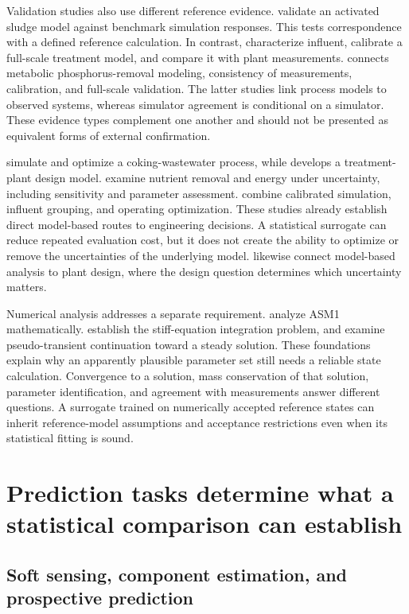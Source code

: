 Validation studies also use different reference evidence. \citet{Calise2020} validate an activated sludge model against benchmark simulation responses. This tests correspondence with a defined reference calculation. In contrast, \citet{SadriMoghaddam2021} characterize influent, calibrate a full-scale treatment model, and compare it with plant measurements. \citet{Meijer2004} connects metabolic phosphorus-removal modeling, consistency of measurements, calibration, and full-scale validation. The latter studies link process models to observed systems, whereas simulator agreement is conditional on a simulator. These evidence types complement one another and should not be presented as equivalent forms of external confirmation.

\citet{Wu2016} simulate and optimize a coking-wastewater process, while \citet{Jasim2020} develops a treatment-plant design model. \citet{Szelag2022} examine nutrient removal and energy under uncertainty, including sensitivity and parameter assessment. \citet{Nazif2023} combine calibrated simulation, influent grouping, and operating optimization. These studies already establish direct model-based routes to engineering decisions. A statistical surrogate can reduce repeated evaluation cost, but it does not create the ability to optimize or remove the uncertainties of the underlying model. \citet{Rivas2008} likewise connect model-based analysis to plant design, where the design question determines which uncertainty matters.

Numerical analysis addresses a separate requirement. \citet{Nelson2009} analyze ASM1 mathematically. \citet{CurtissHirschfelder1952} establish the stiff-equation integration problem, and \citet{KelleyKeyes1998} examine pseudo-transient continuation toward a steady solution. These foundations explain why an apparently plausible parameter set still needs a reliable state calculation. Convergence to a solution, mass conservation of that solution, parameter identification, and agreement with measurements answer different questions. A surrogate trained on numerically accepted reference states can inherit reference-model assumptions and acceptance restrictions even when its statistical fitting is sound.

\section{Prediction tasks determine what a statistical comparison can establish}

\subsection{Soft sensing, component estimation, and prospective prediction}

